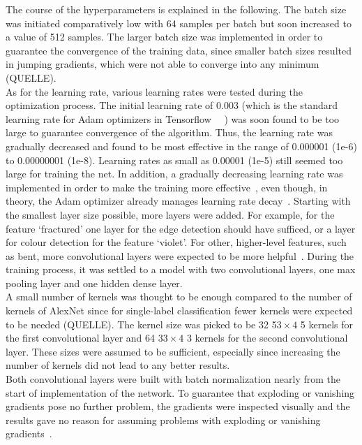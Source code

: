 The course of the hyperparameters is explained in the following.
The batch size was initiated comparatively low with 64 samples per batch but soon increased to a value of 512 samples. The larger batch size was implemented in order to guarantee the convergence of the training data, since smaller batch sizes resulted in jumping gradients, which were not able to converge into any minimum~\citep{bengio2012practical} (QUELLE). \\
As for the learning rate, various learning rates were tested during the optimization process. The initial learning rate of 0.003 (which is the standard learning rate for Adam optimizers in Tensorflow~\citep{kingma2014adam} ~\citep{geron2019hands}) was soon found to be too large to guarantee convergence of the algorithm. Thus, the learning rate was gradually decreased and found to be most effective in the range of 0.000001 (1e-6) to 0.00000001 (1e-8). Learning rates as small as 0.00001 (1e-5) still seemed too large for training the net. In addition, a gradually decreasing learning rate was implemented in order to make the training more effective~\citep{bengio2012practical}, even though, in theory, the Adam optimizer already manages learning rate decay~\citep{kingma2014adam}.
Starting with the smallest layer size possible, more layers were added. For example, for the feature ‘fractured’ one layer for the edge detection should have sufficed, or a layer for colour detection for the feature ‘violet’. For other, higher-level features, such as bent, more convolutional layers were expected to be more helpful~\citep{geron2019hands}. During the training process, it was settled to a model with two convolutional layers, one max pooling layer and one hidden dense layer. \\
A small number of kernels was thought to be enough compared to the number of kernels of AlexNet since for single-label classification fewer kernels were expected to be needed (QUELLE). The kernel size was picked to be 32 5$3\times4$ 5 kernels for the first convolutional layer and 64 3$3\times4$ 3 kernels for the second convolutional layer. These sizes were assumed to be sufficient, especially since increasing the number of kernels did not lead to any better results. \\
Both convolutional layers were built with batch normalization nearly from the start of implementation of the network. To guarantee that exploding or vanishing gradients pose no further problem, the gradients were inspected visually and the results gave no reason for assuming problems with exploding or vanishing gradients~\citep{pascanu2012understanding}.
